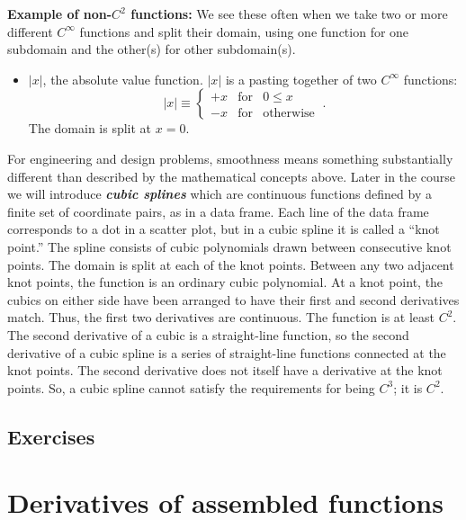 \documentclass[
  letterpaper,
  DIV=11,
  numbers=noendperiod,
  oneside]{scrreprt}
\providecommand{\tightlist}{%
  \setlength{\itemsep}{0pt}\setlength{\parskip}{0pt}}
\begin{document}
\textbf{Example of non-\(C^2\) functions:} We see these often when we
take two or more different \(C^\infty\) functions and split their
domain, using one function for one subdomain and the other(s) for other
subdomain(s).

\begin{itemize}
\tightlist
\item
  \(|x|\), the absolute value function. \(|x|\) is a pasting together of
  two \(C^\infty\) functions:
  \[|x| \equiv \left\{\begin{array}{rcl}+x & \text{for} & 0 \leq x\\-x&\text{for}& \text{otherwise}\end{array} \right.\ .\]
  The domain is split at \(x=0\).
\end{itemize}

For engineering and design problems, smoothness means something
substantially different than described by the mathematical concepts
above. Later in the course we will introduce \textbf{\emph{cubic
splines}} which are continuous functions defined by a finite set of
coordinate pairs, as in a data frame. Each line of the data frame
corresponds to a dot in a scatter plot, but in a cubic spline it is
called a ``knot point.'' The spline consists of cubic polynomials drawn
between consecutive knot points. The domain is split at each of the knot
points. Between any two adjacent knot points, the function is an
ordinary cubic polynomial. At a knot point, the cubics on either side
have been arranged to have their first and second derivatives match.
Thus, the first two derivatives are continuous. The function is at least
\(C^2\). The second derivative of a cubic is a straight-line function,
so the second derivative of a cubic spline is a series of straight-line
functions connected at the knot points. The second derivative does not
itself have a derivative at the knot points. So, a cubic spline cannot
satisfy the requirements for being \(C^3\); it is \(C^2\).

\hypertarget{exercises-5}{%
\section{Exercises}\label{exercises-5}}

\hypertarget{sec-prod-comp-rules}{%
\chapter{Derivatives of assembled functions}\label{sec-prod-comp-rules}}
\end{document}
